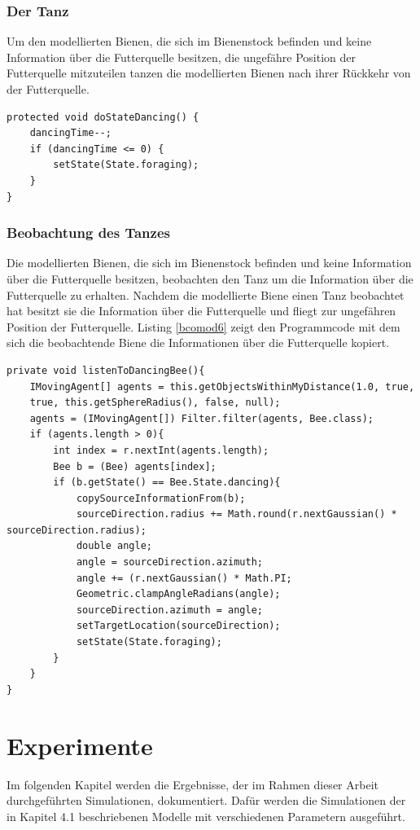 \documentclass[a4paper, 11pt]{article}
\begin{document}
\subsubsection{Der Tanz}
Um den modellierten Bienen, die sich im Bienenstock befinden und keine Information über die Futterquelle besitzen, die ungefähre Position der Futterquelle mitzuteilen tanzen die modellierten Bienen nach ihrer Rückkehr von der Futterquelle.\newline
\begin{lstlisting}[caption= Bienen: Der Tanz,label = bcomod5]
protected void doStateDancing() {
	dancingTime--;
	if (dancingTime <= 0) {
		setState(State.foraging);
	}
}
\end{lstlisting}
\subsubsection{Beobachtung des Tanzes}
Die modellierten Bienen, die sich im Bienenstock befinden und keine Information über die Futterquelle besitzen, beobachten den Tanz um die Information über die Futterquelle zu erhalten. Nachdem die modellierte Biene einen Tanz beobachtet hat besitzt sie die Information über die Futterquelle und fliegt zur ungefähren Position der Futterquelle. Listing \ref{bcomod6} zeigt den Programmcode mit dem sich die beobachtende Biene die Informationen über die Futterquelle kopiert.\newline
\begin{lstlisting}[caption= Bienen: Beobachtung des Tanzes,label = bcomod6]
private void listenToDancingBee(){
	IMovingAgent[] agents = this.getObjectsWithinMyDistance(1.0, true,
	true, this.getSphereRadius(), false, null);
	agents = (IMovingAgent[]) Filter.filter(agents, Bee.class);
	if (agents.length > 0){
		int index = r.nextInt(agents.length);
		Bee b = (Bee) agents[index];
		if (b.getState() == Bee.State.dancing){
			copySourceInformationFrom(b);
			sourceDirection.radius += Math.round(r.nextGaussian() * sourceDirection.radius);
			double angle;
			angle = sourceDirection.azimuth;
			angle += (r.nextGaussian() * Math.PI;
			Geometric.clampAngleRadians(angle);
			sourceDirection.azimuth = angle;
			setTargetLocation(sourceDirection);
			setState(State.foraging);
		}
	}
}
\end{lstlisting}
\newpage
\section{Experimente}
Im folgenden Kapitel werden die Ergebnisse, der im Rahmen dieser Arbeit durchgeführten Simulationen, dokumentiert. Dafür werden die Simulationen der in Kapitel 4.1 beschriebenen Modelle mit verschiedenen Parametern ausgeführt.
\end{document}
